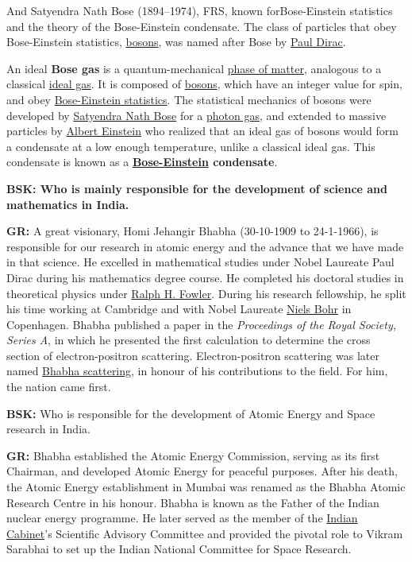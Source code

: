 And Satyendra Nath Bose (1894--1974), FRS, known for\break Bose-Einstein statistics and the theory of the Bose-Einstein condensate. The class of particles that obey Bose-Einstein statistics, \underline{bosons}, was named after Bose by \underline{Paul Dirac}.

An ideal \textbf{Bose gas} is a quantum-mechanical \underline{phase of matter}, analogous to a classical \underline{ideal gas}. It is composed of \underline{bosons}, which have an integer value for spin, and obey \underline{Bose-Einstein statistics}. The statistical mechanics of bosons were developed by \underline{Satyendra Nath Bose} for a \underline{photon gas}, and extended to massive particles by \underline{Albert Einstein} who realized that an ideal gas of bosons would form a condensate at a low enough temperature, unlike a classical ideal gas. This condensate is known as a \textbf{\underline{Bose-Einstein} condensate}.

\textbf{BSK: Who is mainly responsible for the development of science and mathematics in India.}

\textbf{GR:}  A great visionary, Homi Jehangir Bhabha (30-10-1909 to 24-1-1966), is responsible for our research in atomic energy and the advance that we have made in that science. He excelled in mathematical studies under Nobel Laureate Paul Dirac during his mathematics degree course.  He completed his doctoral studies in theoretical physics under \underline{Ralph H. Fowler}. During his research fellowship, he split his time working at Cambridge and with Nobel Laureate \underline{Niels Bohr} in Copenhagen. Bhabha published a paper in the \textit{Proceedings of the Royal Society, Series A}, in which he presented the first calculation to determine the cross section of electron-positron scattering. Electron-positron scattering was later named \underline{Bhabha scattering}, in honour of his contributions to the field. For him, the nation came first.
\vskip 1pt

\textbf{BSK:} Who is responsible for the development of Atomic Energy and Space research in India.
\vskip 1pt

\textbf{GR:} Bhabha established the Atomic Energy Commission, serving as its first Chairman, and developed Atomic Energy for peaceful purposes. After his death, the Atomic Energy establishment in Mumbai was renamed as the Bhabha Atomic Research Centre in his honour. Bhabha is known as the Father of the Indian nuclear energy programme. He later served as the member of the \underline{Indian Cabinet}'s Scientific Advisory Committee and provided the pivotal role to Vikram Sarabhai to set up the Indian National Committee for Space Research.
\vskip 1pt

